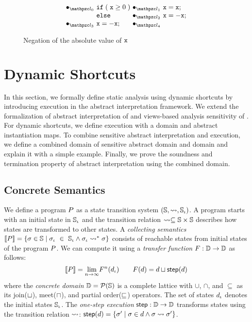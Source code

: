 \begin{figure}[t]
  \[
    \begin{array}{r@{~}l@{~}c@{~}l}
      \labdot{0} & \kwif \; (\; \varx \geq 0 \;) & \labdot{1} & \varx = \varx ;\\
                 & \kwelse & \labdot{2} & \varx = -\varx ;\\
      \labdot{3} & \varx = -\varx ; & \labdot{4} \\
    \end{array}
  \]
  \vspace*{-1em}
  \caption{Negation of the absolute value of $\texttt{x}$}
  \label{fig:running-example}
\end{figure}

\section{Dynamic Shortcuts}\label{sec:formal}
In this section, we formally define static analysis using dynamic shortcuts by
introducing {\sealed} execution in the abstract interpretation framework.
We extend the formalization of abstract interpretation of \citet{abs-interp-1977,
abs-interp-1992} and views-based analysis sensitivity of \citet{sens-toplas}.
For dynamic shortcuts, we define {\sealed} execution with a
{\sealed} domain and abstract instantiation maps.  To combine
sensitive abstract interpretation and {\sealed} execution, we define
a combined domain of sensitive abstract domain and {\sealed} domain and
explain it with a simple example. Finally, we prove the soundness and
termination property of abstract interpretation using the combined domain.


\subsection{Concrete Semantics}

We define a program $P$ as a state transition system $(\mathbb{S}, \leadsto,
\mathbb{S}_\iota)$.  A program starts with an initial state in $\mathbb{S}_\iota$ and the
transition relation $\leadsto \subseteq \mathbb{S} \times \mathbb{S}$ describes how states
are transformed to other states.  A \textit{collecting semantics} $\llbracket P \rrbracket =
\{ \sigma \in \mathbb{S} \mid \sigma_\iota~\in~\mathbb{S}_\iota \wedge \sigma_\iota \leadsto^* \sigma \}$ consists of
reachable states from initial states of the program $P$.  We can compute
it using a \textit{transfer function} $F: \mathbb{D} \rightarrow \mathbb{D}$ as
follows:
\[
  \llbracket P \rrbracket = \underset{n \rightarrow \infty}{\lim}{F^n(d_\iota)}\\
  \qquad
  F(d) = d \sqcup \textsf{step}(d)\\
\]
where the \textit{concrete domain} $\mathbb{D} = \mathcal{P}(\mathbb{S})$ is a complete lattice
with $\cup$, $\cap$, and $\subseteq$ as its join($\sqcup$), meet($\sqcap$), and
partial order($\sqsubseteq$) operators.  The set of states $d_\iota$ denotes the
initial states $\mathbb{S}_\iota$.  The \textit{one-step execution} $\textsf{step}: \mathbb{D}
\rightarrow \mathbb{D}$ transforms states using the transition relation $\leadsto$:
$\textsf{step}(d) = \{ \sigma' \mid \sigma \in d \wedge \sigma \leadsto \sigma' \}$.

